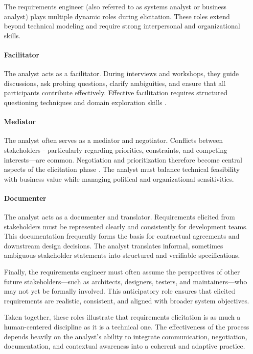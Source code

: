 The requirements engineer (also referred to as systems analyst or business analyst) plays multiple dynamic roles during elicitation. These roles extend beyond technical modeling and require strong interpersonal and organizational skills.

\paragraph{Facilitator} The analyst acts as a facilitator. During interviews and workshops, they guide discussions, ask probing questions, clarify ambiguities, and ensure that all participants contribute effectively. Effective facilitation requires structured questioning techniques and domain exploration skills \cite{Goguen1993}.

\paragraph{Mediator} The analyst often serves as a mediator and negotiator. Conflicts between stakeholders - particularly regarding priorities, constraints, and competing interests—are common. Negotiation and prioritization therefore become central aspects of the elicitation phase \cite{Davis1994}. The analyst must balance technical feasibility with business value while managing political and organizational sensitivities.

\paragraph{Documenter} The analyst acts as a documenter and translator. Requirements elicited from stakeholders must be represented clearly and consistently for development teams. This documentation frequently forms the basis for contractual agreements and downstream design decisions. The analyst translates informal, sometimes ambiguous stakeholder statements into structured and verifiable specifications.

Finally, the requirements engineer must often assume the perspectives of other future stakeholders—such as architects, designers, testers, and maintainers—who may not yet be formally involved. This anticipatory role ensures that elicited requirements are realistic, consistent, and aligned with broader system objectives.

Taken together, these roles illustrate that requirements elicitation is as much a human-centered discipline as it is a technical one. The effectiveness of the process depends heavily on the analyst's ability to integrate communication, negotiation, documentation, and contextual awareness into a coherent and adaptive practice.

